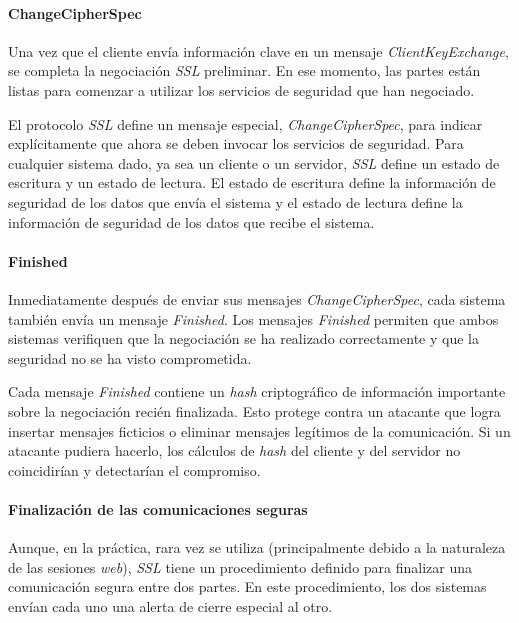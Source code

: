 \paragraph*{ChangeCipherSpec}
Una vez que el cliente envía información clave en un mensaje 
\emph{ClientKeyExchange}, se completa la negociación \emph{SSL} preliminar. En ese 
momento, las partes están listas para comenzar a utilizar los servicios 
de seguridad que han negociado.

El protocolo \emph{SSL} define un mensaje especial, \emph{ChangeCipherSpec}, para 
indicar explícitamente que ahora se deben invocar los servicios de 
seguridad. Para cualquier sistema dado, 
ya sea un cliente o un servidor, \emph{SSL} define un estado de escritura y 
un estado de lectura. El estado de escritura define la información de 
seguridad de los datos que envía el sistema y el estado de lectura 
define la información de seguridad de los datos que recibe el sistema.

\paragraph*{Finished}
Inmediatamente después de enviar sus mensajes \emph{ChangeCipherSpec}, cada 
sistema también envía un mensaje \emph{Finished}. Los mensajes \emph{Finished}
permiten que ambos sistemas verifiquen que la negociación se ha realizado 
correctamente y que la seguridad no se ha visto comprometida.

Cada mensaje \emph{Finished} contiene un \emph{hash} criptográfico de información 
importante sobre la negociación recién finalizada. Esto protege contra 
un atacante que logra insertar mensajes ficticios o eliminar mensajes 
legítimos de la comunicación. Si un atacante pudiera hacerlo, los 
cálculos de \emph{hash} del cliente y del servidor no coincidirían y detectarían 
el compromiso.

\paragraph*{Finalización de las comunicaciones seguras}

Aunque, en la práctica, rara vez se utiliza (principalmente debido a la 
naturaleza de las sesiones \emph{web}), \emph{SSL} tiene un procedimiento definido para 
finalizar una comunicación segura entre dos partes. En este procedimiento, 
los dos sistemas envían cada uno una alerta de cierre especial al otro. 



